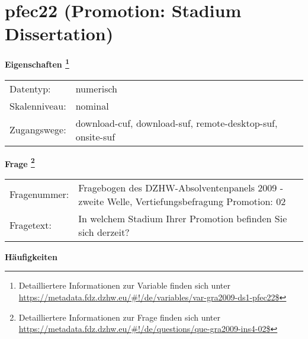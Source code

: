 
    \setcounter{footnote}{0}

    \vspace*{-1.8cm}
	\section{pfec22 (Promotion: Stadium Dissertation)}
	\label{section:pfec22}



    \vspace*{0.5cm}
    \noindent\textbf{Eigenschaften
	\footnote{Detailliertere Informationen zur Variable finden sich unter
		\url{https://metadata.fdz.dzhw.eu/\#!/de/variables/var-gra2009-ds1-pfec22$}}}\\
	\begin{tabularx}{\hsize}{@{}lX}
	Datentyp: & numerisch \\
	Skalenniveau: & nominal \\
	Zugangswege: &
	  download-cuf, 
	  download-suf, 
	  remote-desktop-suf, 
	  onsite-suf
 \\
    \end{tabularx}



				\vspace*{0.5cm}
                \noindent\textbf{Frage
	                \footnote{Detailliertere Informationen zur Frage finden sich unter
		              \url{https://metadata.fdz.dzhw.eu/\#!/de/questions/que-gra2009-ins4-02$}}}\\
				\begin{tabularx}{\hsize}{@{}lX}
					Fragenummer: &
					  Fragebogen des DZHW-Absolventenpanels 2009 - zweite Welle, Vertiefungsbefragung Promotion:
					  02
 \\
					Fragetext: & In welchem Stadium Ihrer Promotion befinden Sie sich derzeit? \\
				\end{tabularx}





        		\vspace*{0.5cm}
                \noindent\textbf{Häufigkeiten}

